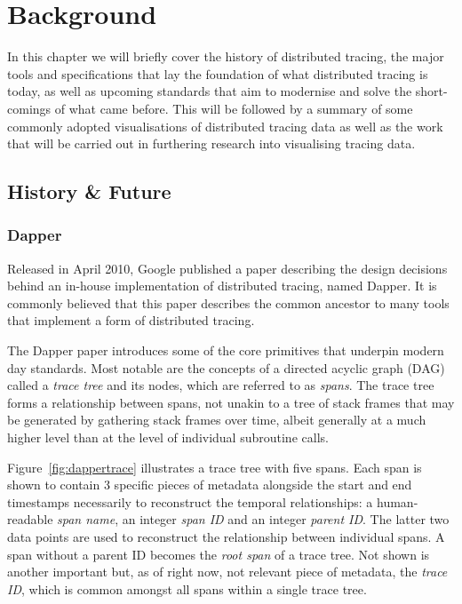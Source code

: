 \documentclass[12pt,pdftex,titlepage]{report}
\begin{document}
    \chapter{Background}
        In this chapter we will briefly cover the history of distributed tracing, the major tools and specifications that lay the foundation of what distributed tracing is today,
        as well as upcoming standards that aim to modernise and solve the short-comings of what came before. This will be followed by a summary of some commonly adopted visualisations
        of distributed tracing data as well as the work that will be carried out in furthering research into visualising tracing data.
        \bigskip

        \section{History \& Future}
            \subsection{Dapper}
                Released in April 2010, Google published a paper describing the design decisions behind an in-house implementation 
                of distributed tracing, named Dapper. It is commonly believed that this paper describes the common ancestor to 
                many tools that implement a form of distributed tracing.

                The Dapper paper introduces some of the core primitives that underpin modern day standards. Most notable are the concepts
                of a directed acyclic graph (DAG) called a \textit{trace tree} and its nodes, which are referred to as \textit{spans}. 
                The trace tree forms a relationship between spans, not unakin to a tree of stack frames that may be generated by
                gathering stack frames over time, albeit generally at a much higher level than at the level of individual subroutine calls. 

                Figure~\ref{fig:dappertrace} illustrates a trace tree with five spans. Each span is shown to contain 3 specific pieces of
                metadata alongside the start and end timestamps necessarily to reconstruct the temporal relationships: a human-readable
                \textit{span name}, an integer \textit{span ID} and an integer \textit{parent ID}. The latter two
                data points are used to reconstruct the relationship between individual spans. A span without a parent ID becomes the 
                \textit{root span} of a trace tree. Not shown is another important but, as of right now, not relevant piece of metadata, the 
                \textit{trace ID}, which is common amongst all spans within a single trace tree.
\end{document}
